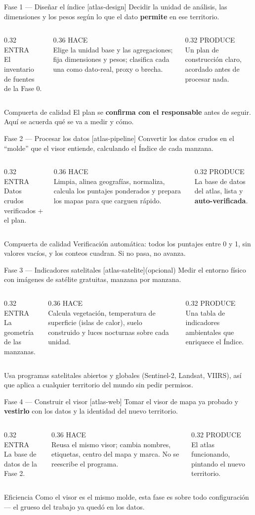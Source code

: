 \documentclass[aspectratio=169,11pt]{beamer}
\newcommand{\skilltag}[1]{{\color{tAccentD}\ttfamily\footnotesize[#1]}}
\newcommand{\lead}[1]{{\color{tPrimary}\large #1}\par\medskip}
\newcommand{\ehs}[3]{%
\begin{columns}[T]
  \begin{column}{0.32\textwidth}
    {\color{tMuted}\ttfamily\footnotesize ENTRA}\\[2pt]{\small #1}
  \end{column}
  \begin{column}{0.36\textwidth}
    {\color{tMuted}\ttfamily\footnotesize HACE}\\[2pt]{\small #2}
  \end{column}
  \begin{column}{0.32\textwidth}
    {\color{tMuted}\ttfamily\footnotesize PRODUCE}\\[2pt]{\small #3}
  \end{column}
\end{columns}}
\begin{document}
\begin{frame}{Fase 1 — Diseñar el índice \skilltag{atlas-design}}
\lead{Decidir la unidad de análisis, las dimensiones y los pesos según lo que el dato \textbf{permite} en ese territorio.}
\ehs{El inventario de fuentes de la Fase 0.}{Elige la unidad base y las agregaciones; fija dimensiones y pesos; clasifica cada una como dato-real, proxy o brecha.}{Un plan de construcción claro, acordado antes de procesar nada.}
\vfill
\begin{block}{Compuerta de calidad}
El plan se \textbf{confirma con el responsable} antes de seguir. Aquí se acuerda qué se va a medir y cómo.
\end{block}
\end{frame}

\begin{frame}{Fase 2 — Procesar los datos \skilltag{atlas-pipeline}}
\lead{Convertir los datos crudos en el ``molde'' que el visor entiende, calculando el Índice de cada manzana.}
\ehs{Datos crudos verificados + el plan.}{Limpia, alinea geografías, normaliza, calcula los puntajes ponderados y prepara los mapas para que carguen rápido.}{La base de datos del atlas, lista y \textbf{auto-verificada}.}
\vfill
\begin{block}{Compuerta de calidad}
Verificación automática: todos los puntajes entre 0 y 1, sin valores vacíos, y los conteos cuadran. Si no pasa, no avanza.
\end{block}
\end{frame}

\begin{frame}{Fase 3 — Indicadores satelitales \skilltag{atlas-satelite}\;\;\small(opcional)}
\lead{Medir el entorno físico con imágenes de satélite gratuitas, manzana por manzana.}
\ehs{La geometría de las manzanas.}{Calcula vegetación, temperatura de superficie (islas de calor), suelo construido y luces nocturnas sobre cada unidad.}{Una tabla de indicadores ambientales que enriquece el Índice.}
\vfill
{\footnotesize\color{tMuted} Usa programas satelitales abiertos y globales (Sentinel-2, Landsat, VIIRS), así que aplica a cualquier territorio del mundo sin pedir permisos.}
\end{frame}

\begin{frame}{Fase 4 — Construir el visor \skilltag{atlas-web}}
\lead{Tomar el visor de mapa ya probado y \textbf{vestirlo} con los datos y la identidad del nuevo territorio.}
\ehs{La base de datos de la Fase 2.}{Reusa el mismo visor; cambia nombres, etiquetas, centro del mapa y marca. No se reescribe el programa.}{El atlas funcionando, pintando el nuevo territorio.}
\vfill
\begin{block}{Eficiencia}
Como el visor es el mismo molde, esta fase es sobre todo configuración — el grueso del trabajo ya quedó en los datos.
\end{block}
\end{frame}
\end{document}
